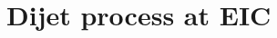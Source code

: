 \documentclass[11pt]{article}
\numberwithin{equation}{section}
\numberwithin{table}{section}
\numberwithin{figure}{section}
\begin{document}


%
\section{Dijet process at EIC}
\label{Dijet process at EIC}
%
\end{document}
